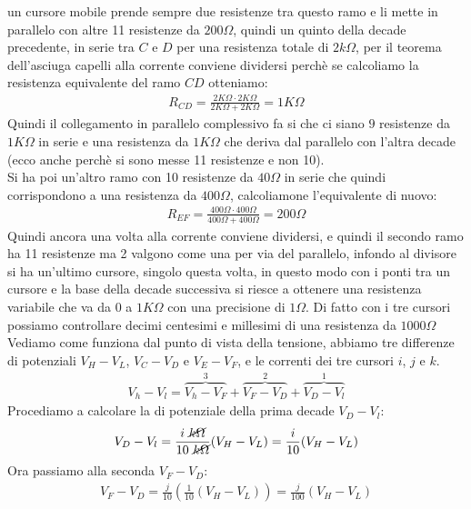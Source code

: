 \documentclass[a4paper, oneside]{article}
\begin{document}
un cursore mobile prende sempre due resistenze tra questo ramo e li mette in parallelo con altre 11 resistenze da $200 \Omega$, quindi un quinto 
della decade precedente, in serie tra $C$ e $D$ per una resistenza totale di $2 k \Omega$, per il teorema dell'asciuga capelli alla corrente conviene dividersi perchè se calcoliamo la resistenza equivalente del ramo $CD$ otteniamo:
\begin{gather*}
    R_{CD} = \frac{2 K\Omega \cdot 2 K\Omega}{2 K\Omega + 2 K\Omega} = 1 K \Omega
\end{gather*}
Quindi il collegamento in parallelo complessivo fa si che ci siano $9$ resistenze da $1 K \Omega$ in serie e una resistenza da $1 K \Omega$ che deriva dal parallelo con l'altra decade (ecco anche perchè si sono messe 11 resistenze e non 10).\\
Si ha poi un'altro ramo con 10 resistenze da $40 \Omega$ in serie che quindi corrispondono a una resistenza da $400 \Omega$, calcoliamone l'equivalente di nuovo:
\begin{gather*}
    R_{EF} = \frac{400 \Omega \cdot 400 \Omega}{400 \Omega + 400 \Omega} = 200 \Omega
\end{gather*}
Quindi ancora una volta alla corrente conviene dividersi, e quindi il secondo ramo ha 11 resistenze ma 2 valgono come una per via del parallelo, infondo al divisore si ha un'ultimo cursore, singolo questa volta, in questo modo 
con i ponti tra un cursore e la base della decade successiva si riesce a ottenere una resistenza variabile che va da $0$ a $1 K \Omega$ con una precisione di $1 \Omega$. Di fatto con i tre cursori possiamo controllare decimi centesimi e millesimi di una resistenza da $1000 \Omega$\\
Vediamo come funziona dal punto di vista della tensione, abbiamo tre differenze di potenziali $V_H - V_L$, $V_C - V_D$ e $V_E - V_F$, e le correnti dei tre cursori $i$, $j$ e $k$.\\
\begin{gather*}
    V_h - V_l = \overbrace{V_h - V_F}^3 + \overbrace{V_F - V_D}^2 + \overbrace{V_D - V_l}^1
\end{gather*}
Procediamo a calcolare la di potenziale della prima decade $V_D - V_l$:
\begin{gather*}
    V_D - V_l = \frac{i \ \cancel{k\Omega}}{ 10 \ \cancel{ k \Omega}} (V_H - V_L) = \frac{i}{10} (V_H - V_L)
\end{gather*}
Ora passiamo alla seconda $V_F - V_D$:
\begin{gather*}
    V_F - V_D = \frac{j}{10}(\frac{1}{10} (V_H - V_L)) = \frac{j}{100} (V_H - V_L)
\end{gather*}
\end{document}
